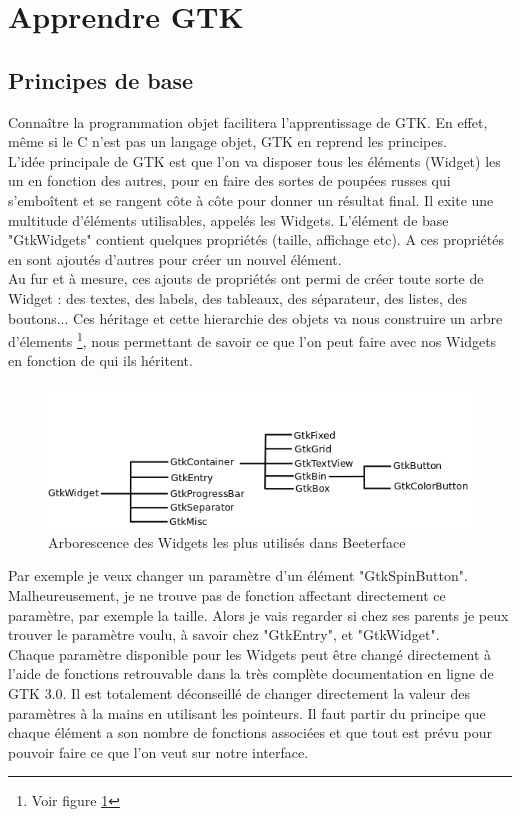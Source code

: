 \documentclass[11pt,french,a4paper]{report}
\begin{document}
\section{Apprendre GTK}
    \subsection{Principes de base}
Connaître la programmation objet facilitera l'apprentissage de GTK. En effet, même si le C n'est pas un langage objet,
GTK en reprend les principes. \\
L'idée principale de GTK est que l'on va disposer tous les éléments (Widget) les un en fonction des autres, pour en faire des sortes de 
poupées russes qui s'emboîtent et se rangent côte à côte pour donner un résultat final. Il exite une multitude d'éléments utilisables, 
appelés les Widgets. L'élément de base "GtkWidgets" contient quelques propriétés (taille, affichage etc). 
A ces propriétés en sont ajoutés d'autres pour créer un nouvel élément. \\
Au fur et à mesure, ces ajouts de propriétés ont permi de créer toute sorte de Widget : des textes, des labels, des tableaux, 
des séparateur, des listes, des boutons... 
Ces héritage et cette hierarchie des objets va nous construire un arbre d'élements \footnote{Voir figure \ref{arbo_widg}}, 
nous permettant de savoir ce que l'on peut faire avec nos Widgets en fonction de qui ils héritent. 
\begin{figure} [h!]
    \centering
        \includegraphics[scale=0.7]{../images/dia/arbo_widget.png} 
        \caption{Arborescence des Widgets les plus utilisés dans Beeterface}
        \label{arbo_widg}
\end{figure}
Par exemple je veux changer un paramètre d'un élément "GtkSpinButton". Malheureusement, je ne trouve pas de fonction 
affectant directement ce paramètre, par exemple la taille. Alors je vais regarder si chez ses parents je peux trouver 
le paramètre voulu, à savoir chez "GtkEntry", et "GtkWidget". \\
Chaque paramètre disponible pour les Widgets peut être changé directement à l'aide de fonctions retrouvable dans la très complète 
documentation en ligne de GTK 3.0. Il est totalement déconseillé de changer directement la valeur des paramètres à la mains 
en utilisant les pointeurs. Il faut partir du principe que chaque élément a son nombre de fonctions associées 
et que tout est prévu pour pouvoir faire ce que l'on veut sur notre interface. \\ 
\end{document}
